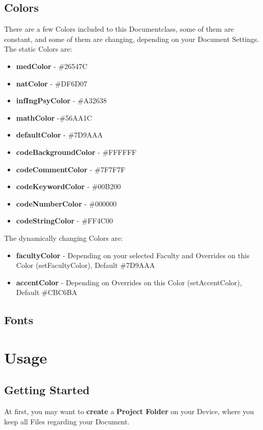 \documentclass[a4paper]{../uulm-document}
\begin{document}
\subsection{Colors}
There are a few Colors included to this Documentclass, some of them are constant, and some of them are changing, depending on your Document Settings. 
The static Colors are:
\begin{itemize}
\item \textbf{medColor} - {\color{medColor}\#26547C}
\item \textbf{natColor} - {\color{natColor}\#DF6D07}
\item \textbf{infIngPsyColor} - {\color{infIngPsyColor}\#A32638}
\item \textbf{mathColor} -{\color{mathColor}\#56AA1C}
\item \textbf{defaultColor} - {\color{defaultColor}\#7D9AAA}
\item \textbf{codeBackgroundColor} - {\color{black}\#FFFFFF}
\item \textbf{codeCommentColor} - {\color{codeCommentColor}\#7F7F7F}
\item \textbf{codeKeywordColor} - {\color{codeKeywordColor}\#00B200}
\item \textbf{codeNumberColor} - {\color{codeNumberColor}\#000000}
\item \textbf{codeStringColor} - {\color{codeStringColor}\#FF4C00}
\end{itemize}
The dynamically changing Colors are:
\begin{itemize}
\item \textbf{facultyColor} - Depending on your selected Faculty and Overrides on this Color (setFacultyColor), Default {\color{defaultColor}\#7D9AAA}
\item \textbf{accentColor} - Depending on Overrides on this Color (setAccentColor), Default {\color{black}\#CBC6BA}
\end{itemize}

\subsection{Fonts}

\newpage

\section{Usage}
\subsection{Getting Started}
At first, you may want to \textbf{create} a \textbf{Project Folder} on your Device, where you keep all Files regarding your Document.
\end{document}
